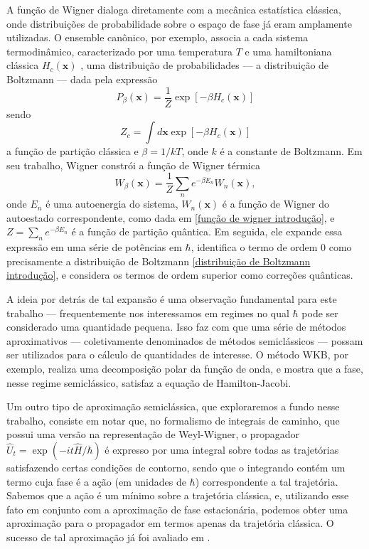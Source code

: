 \documentclass[
	12pt,
	oneside,			%
	a4paper,			%
	english,			%
	brazil				%
	]{abntex2}
\theoremstyle{definition}
\begin{document}
A função de Wigner dialoga diretamente com a mecânica estatística clássica, onde distribuições de probabilidade sobre o espaço de fase já eram amplamente utilizadas. O ensemble canônico, por exemplo, associa a cada sistema termodinâmico, caracterizado por uma temperatura $T$ e uma hamiltoniana clássica $H_c(\mathbf{x})$ , uma distribuição de probabilidades — a distribuição de Boltzmann — dada pela expressão
\begin{equation}
\label{distribuição de Boltzmann introdução}
    P_\beta (\mathbf{x})  = \frac{1}{Z} \exp \left[ -\beta H_c(\mathbf{x}) \right]
\end{equation}
sendo
\begin{equation}
    Z_c = \int d\mathbf{x} \exp \left[ -\beta H_c(\mathbf{x}) \right]
\end{equation}
a função de partição clássica e $\beta = 1/kT$, onde $k$ é a constante de Boltzmann. Em seu trabalho, Wigner constrói a função de Wigner térmica
\begin{equation}
    W_\beta(\mathbf{x}) = \frac{1}{Z} \sum_{n}e^{-\beta E_n} W_n(\mathbf{x}),
\end{equation}
onde $E_n$ é uma autoenergia do sistema, $W_n(\mathbf{x})$ é a função de Wigner do autoestado correspondente, como dada em \eqref{função de wigner introdução}, e $Z = \sum_n e^{-\beta E_n}$ é a função de partição quântica. Em seguida, ele expande essa expressão em uma série de potências em $\hbar$, identifica o termo de ordem $0$ como precisamente a distribuição de Boltzmann \eqref{distribuição de Boltzmann introdução}, e considera os termos de ordem superior como correções quânticas.

A ideia por detrás de tal expansão é uma observação fundamental para este trabalho — frequentemente nos interessamos em regimes no qual $\hbar$ pode ser considerado uma quantidade pequena. Isso faz com que uma série de métodos aproximativos — coletivamente denominados de métodos semiclássicos — possam ser utilizados para o cálculo de quantidades de interesse. O método WKB, por exemplo, realiza uma decomposição polar da função de onda, e mostra que a fase, nesse regime semiclássico, satisfaz a equação de Hamilton-Jacobi. 

Um outro tipo de aproximação semiclássica, que exploraremos a fundo nesse trabalho, consiste em notar que, no formalismo de integrais de caminho, que possui uma versão na representação de Weyl-Wigner, o propagador $\hat{U}_t = \exp \left( -i t \hat{H}/\hbar \right)$ é expresso por uma integral sobre todas as trajetórias satisfazendo certas condições de contorno, sendo que o integrando contém um termo cuja fase é a ação (em unidades de $\hbar$) correspondente a tal trajetória. Sabemos que a ação é um mínimo sobre a trajetória clássica, e, utilizando esse fato em conjunto com a aproximação de fase estacionária, podemos obter uma aproximação para o propagador em termos apenas da trajetória clássica. O sucesso de tal aproximação já foi avaliado em \cite{PhysRevA.99.042125}.
\end{document}
